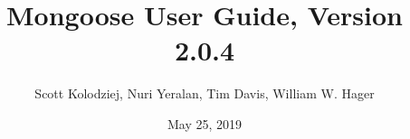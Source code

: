 \title{Mongoose User Guide, Version 2.0.4}
\author{Scott Kolodziej, Nuri Yeralan, Tim Davis, William W. Hager}
\date{May 25, 2019}
